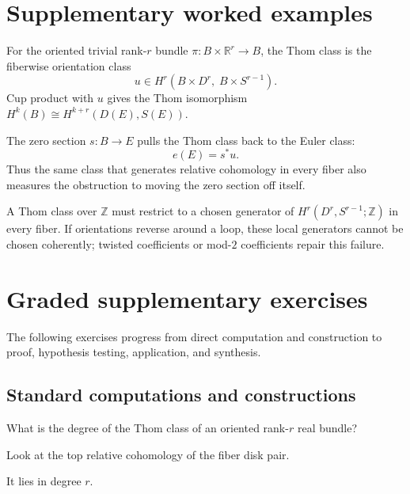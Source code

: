\section{Supplementary worked examples}
\label{sec:viii31-pedagogy}

\begin{example}\label{ex:viii31-ped-01}
For the oriented trivial rank-$r$ bundle $\pi:B\times\mathbb R^r\to B$, the Thom class is the fiberwise orientation class
\[
u\in H^r(B\times D^r,\;B\times S^{r-1}).
\]
Cup product with $u$ gives the Thom isomorphism $H^k(B)\cong H^{k+r}(D(E),S(E))$.
\end{example}

\begin{example}\label{ex:viii31-ped-02}
The zero section $s:B\to E$ pulls the Thom class back to the Euler class:
\[
e(E)=s^*u.
\]
Thus the same class that generates relative cohomology in every fiber also measures the obstruction to moving the zero section off itself.
\end{example}

\begin{example}\label{ex:viii31-ped-03}
A Thom class over $\mathbb Z$ must restrict to a chosen generator of $H^r(D^r,S^{r-1};\mathbb Z)$ in every fiber. If orientations reverse around a loop, these local generators cannot be chosen coherently; twisted coefficients or mod-$2$ coefficients repair this failure.
\end{example}

\section{Graded supplementary exercises}
The following exercises progress from direct computation and construction to proof, hypothesis testing, application, and synthesis.

\subsection*{Standard computations and constructions}

\begin{exercise}\label{exr:viii31-ped-01}
What is the degree of the Thom class of an oriented rank-$r$ real bundle?
\end{exercise}
\begin{hint}
Look at the top relative cohomology of the fiber disk pair.
\end{hint}
\begin{solution}
It lies in degree $r$.
\end{solution}

